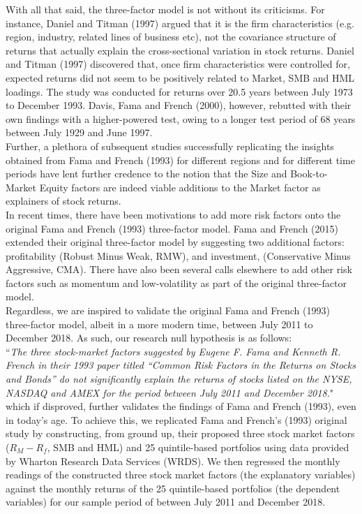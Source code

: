 \documentclass[12pt]{article}
\begin{document}
	\noindent With all that said, the three-factor model is not without its criticisms. For instance, Daniel and Titman (1997) argued that it is the firm characteristics (e.g. region, industry, related lines of business etc), not the covariance structure of returns that actually explain the cross-sectional variation in stock returns. Daniel and Titman (1997) discovered that, once firm
	characteristics were controlled for, expected returns did not seem to be positively related to Market, SMB and HML loadings. The study was conducted for returns over 20.5 years between July 1973 to December 1993. Davis, Fama and French (2000), however, rebutted with their own findings with a higher-powered test, owing to a longer test period of 68 years between July 1929 and June 1997.\\
	
	\noindent Further, a plethora of subsequent studies successfully replicating the insights obtained from Fama and French (1993) for different regions and for different time periods have lent further credence to the notion that the Size and Book-to-Market Equity factors are indeed viable additions to the Market factor as explainers of stock returns.\\
	
	\noindent In recent times, there have been motivations to add more risk factors onto the original Fama and French (1993) three-factor model. Fama and French (2015) extended their original three-factor model by suggesting two additional factors: profitability (Robust Minus Weak, RMW), and investment, (Conservative Minus Aggressive, CMA). There have also been several calls elsewhere to add other risk factors such as momentum and low-volatility as part of the original three-factor model. \\
	
	\noindent Regardless, we are inspired to validate the original Fama and French (1993) three-factor model, albeit in a more modern time, between July 2011 to December 2018. As such, our research null hypothesis is as follows:\\
	
	``\textit{The three stock-market factors suggested by Eugene F. Fama and Kenneth R. French in their 1993 paper titled “Common Risk Factors in the Returns on Stocks and Bonds” do not significantly explain the returns of stocks listed on the NYSE, NASDAQ and AMEX for the period between July 2011 and December 2018.}" \\

	\noindent which if disproved, further validates the findings of Fama and French (1993), even in today's age. To achieve this, we replicated Fama and French's (1993) original study by constructing, from ground up, their proposed three stock market factors ($R_M-R_f$, SMB and HML) and 25 quintile-based portfolios using data provided by Wharton Research Data Services (WRDS). We then regressed the monthly readings of the constructed three stock market factors (the explanatory variables) against the monthly returns of the 25 quintile-based portfolios (the dependent variables) for our sample period of between July 2011 and December 2018. 
	
\end{document}
